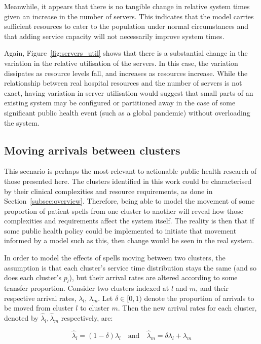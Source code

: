 \documentclass[]{interact}
\theoremstyle{plain}%
\theoremstyle{definition}
\theoremstyle{remark}
\begin{document}
Meanwhile, it appears that there is no tangible change in relative system times
given an increase in the number of servers. This indicates that the model
carries sufficient resources to cater to the population under normal
circumstances and that adding service capacity will not necessarily improve
system times.

Again, Figure~\ref{fig:servers_util} shows that there is a substantial change in
the variation in the relative utilisation of the servers. In this case, the
variation dissipates as resource levels fall, and increases as resources
increase. While the relationship between real hospital resources and the number
of servers is not exact, having variation in server utilisation would suggest
that small parts of an existing system may be configured or partitioned away in
the case of some significant public health event (such as a global pandemic)
without overloading the system.


\subsection{Moving arrivals between clusters}\label{subsec:moving}

This scenario is perhaps the most relevant to actionable public health research
of those presented here. The clusters identified in this work could be
characterised by their clinical complexities and resource requirements, as done
in Section~\ref{subsec:overview}. Therefore, being able to model the movement of
some proportion of patient spells from one cluster to another will reveal how
those complexities and requirements affect the system itself. The reality is
then that if some public health policy could be implemented to initiate that
movement informed by a model such as this, then change would be seen in the real
system.

In order to model the effects of spells moving between two clusters, the
assumption is that each cluster's service time distribution stays the same (and
so does each cluster's \(p_l\)), but their arrival rates are altered according
to some transfer proportion. Consider two clusters indexed at \(l\) and \(m\),
and their respective arrival rates, \(\lambda_l\), \(\lambda_m\). Let \(\delta
\in [0, 1)\) denote the proportion of arrivals to be moved from cluster \(l\) to
cluster \(m\). Then the new arrival rates for each cluster, denoted by
\(\hat\lambda_l, \hat\lambda_m\) respectively, are:

\begin{equation}\label{eq:moving}
    \hat\lambda_l = \left(1 - \delta\right) \lambda_l
    \quad \text{and} \quad
    \hat\lambda_m = \delta\lambda_l + \lambda_m
\end{equation}
\end{document}
